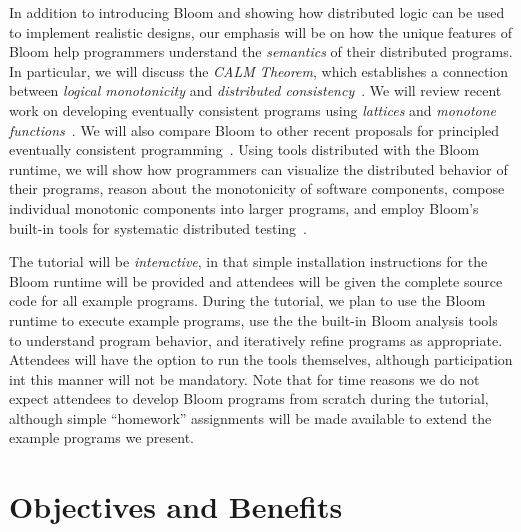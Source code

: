 \documentclass{sig-alternate}
\begin{document}
In addition to introducing Bloom and showing how distributed logic can be used
to implement realistic designs, our emphasis will be on how the unique features
of Bloom help programmers understand the \emph{semantics} of their distributed
programs. In particular, we will discuss the \emph{CALM Theorem}, which
establishes a connection between \emph{logical monotonicity} and
\emph{distributed
  consistency}~\cite{Alvaro2011,Ameloot2011,Hellerstein2010,dedalus-confluence}. We
will review recent work on developing eventually consistent programs using
\emph{lattices} and \emph{monotone functions}~\cite{Conway2012}. We will also
compare Bloom to other recent proposals for principled eventually consistent
programming~\cite{Burckhardt2012,Shapiro2011a,Shapiro2011b}. Using tools distributed with the
Bloom runtime, we will show how programmers can visualize the distributed
behavior of their programs, reason about the monotonicity of software
components, compose individual monotonic components into larger programs, and
employ Bloom's built-in tools for systematic distributed
testing~\cite{Alvaro2012}.

The tutorial will be \emph{interactive}, in that simple installation
instructions for the Bloom runtime will be provided and attendees will be given
the complete source code for all example programs. During the tutorial, we plan
to use the Bloom runtime to execute example programs, use the the built-in Bloom
analysis tools to understand program behavior, and iteratively refine programs
as appropriate. Attendees will have the option to run the tools themselves,
although participation int this manner will not be mandatory. Note that for time
reasons we do not expect attendees to develop Bloom programs from scratch during
the tutorial, although simple ``homework'' assignments will be made available to
extend the example programs we present.

\section{Objectives and Benefits}
\end{document}
